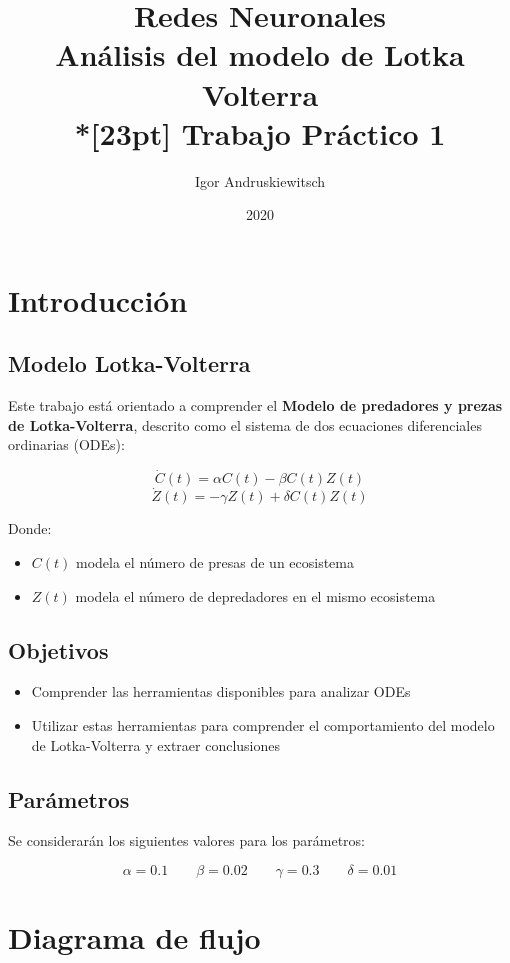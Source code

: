 \documentclass{article}
\title{%
Redes Neuronales \\
Análisis del modelo de Lotka Volterra \\*[23pt]
Trabajo Práctico 1 \\
}
\date{2020}
\author{Igor Andruskiewitsch}
\begin{document}
    \maketitle

\section{Introducción}

\subsection{Modelo Lotka-Volterra}

Este trabajo está orientado a comprender el {\bf Modelo de predadores y prezas de Lotka-Volterra}, descrito como el sistema de dos ecuaciones diferenciales ordinarias (ODEs):

\[ \dot{C}(t) = \alpha C(t) - \beta C(t) Z(t) \]
\[ \dot{Z}(t) = - \gamma Z(t) + \delta C(t) Z(t) \]

Donde:

\begin{itemize}
    \item {$ C(t) $ modela el número de presas de un ecosistema}
    \item {$ Z(t) $ modela el número de depredadores en el mismo ecosistema}
\end{itemize}

\subsection{Objetivos}

\begin{itemize}
    \item {Comprender las herramientas disponibles para analizar ODEs}
    \item {Utilizar estas herramientas para comprender el comportamiento del modelo de Lotka-Volterra y extraer conclusiones}
\end{itemize}

\subsection{Parámetros}

Se considerarán los siguientes valores para los parámetros:

\[ \alpha = 0.1 \qquad \beta = 0.02 \qquad \gamma = 0.3 \qquad \delta = 0.01 \]

\section{Diagrama de flujo}
\end{document}

